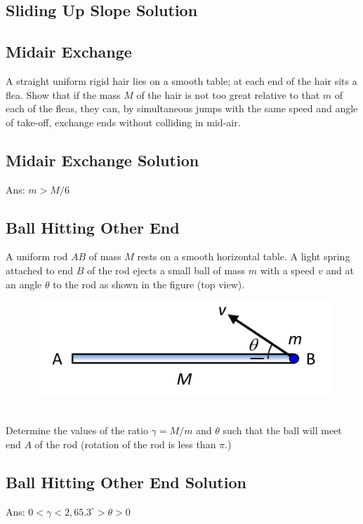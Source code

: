 \documentclass{article}
\begin{document}
\subsection{Sliding Up Slope Solution}
\clearpage
\subsection{Midair Exchange }
A straight uniform rigid hair lies on a smooth table; at each end of the hair sits a flea. Show that if the mass $M$ of the hair is not too great relative to that $m$ of each of the fleas, they can, by simultaneous jumps with the same speed and angle of take-off, exchange ends without colliding in mid-air.

\clearpage
\subsection{Midair Exchange Solution}
Ans: $m>M / 6$
\clearpage
\subsection{Ball Hitting Other End }
A uniform rod $A B$ of mass $M$ rests on a smooth horizontal table. A light spring attached to end $B$ of the rod ejects a small ball of mass $m$ with a speed $v$ and at an angle $\theta$ to the rod as shown in the figure (top view).
\begin{figure}[h]
    \centering
\includegraphics[width=0.5\linewidth]{images/ballhittingotherend.png}
\end{figure}\\
Determine the values of the ratio $\gamma=M / m$ and $\theta$ such that the ball will meet end $A$ of the rod (rotation of the rod is less than $\pi$.)

\clearpage
\subsection{Ball Hitting Other End Solution}
Ans: $0<\gamma<2,65.3^{\circ}>\theta>0$
\clearpage
\end{document}
